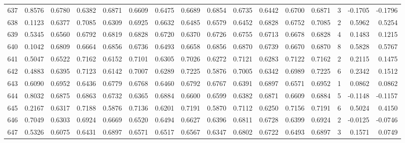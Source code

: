 \begin{tabular}{lrrrrrrrrrrrrrrr}
637 &      0.8576 &  0.6780 &  0.6382 &  0.6871 &  0.6609 &  0.6475 &  0.6689 &  0.6854 &  0.6735 &  0.6442 &   0.6700 &     0.6871 &      3 &                   -0.1705 &                    -0.1796 \\
638 &      0.1123 &  0.6377 &  0.7085 &  0.6309 &  0.6925 &  0.6632 &  0.6485 &  0.6579 &  0.6452 &  0.6828 &   0.6752 &     0.7085 &      2 &                    0.5962 &                     0.5254 \\
639 &      0.5345 &  0.6560 &  0.6792 &  0.6819 &  0.6828 &  0.6720 &  0.6370 &  0.6726 &  0.6755 &  0.6713 &   0.6678 &     0.6828 &      4 &                    0.1483 &                     0.1215 \\
640 &      0.1042 &  0.6809 &  0.6664 &  0.6856 &  0.6736 &  0.6493 &  0.6658 &  0.6856 &  0.6870 &  0.6739 &   0.6670 &     0.6870 &      8 &                    0.5828 &                     0.5767 \\
641 &      0.5047 &  0.6522 &  0.7162 &  0.6152 &  0.7101 &  0.6305 &  0.7026 &  0.6272 &  0.7121 &  0.6283 &   0.7122 &     0.7162 &      2 &                    0.2115 &                     0.1475 \\
642 &      0.4883 &  0.6395 &  0.7123 &  0.6142 &  0.7007 &  0.6289 &  0.7225 &  0.5876 &  0.7005 &  0.6342 &   0.6989 &     0.7225 &      6 &                    0.2342 &                     0.1512 \\
643 &      0.6090 &  0.6952 &  0.6436 &  0.6779 &  0.6768 &  0.6460 &  0.6792 &  0.6767 &  0.6391 &  0.6897 &   0.6571 &     0.6952 &      1 &                    0.0862 &                     0.0862 \\
644 &      0.8032 &  0.6875 &  0.6863 &  0.6732 &  0.6365 &  0.6884 &  0.6600 &  0.6599 &  0.6382 &  0.6871 &   0.6609 &     0.6884 &      5 &                   -0.1148 &                    -0.1157 \\
645 &      0.2167 &  0.6317 &  0.7188 &  0.5876 &  0.7136 &  0.6201 &  0.7191 &  0.5870 &  0.7112 &  0.6250 &   0.7156 &     0.7191 &      6 &                    0.5024 &                     0.4150 \\
646 &      0.7049 &  0.6303 &  0.6924 &  0.6669 &  0.6520 &  0.6494 &  0.6627 &  0.6396 &  0.6811 &  0.6728 &   0.6399 &     0.6924 &      2 &                   -0.0125 &                    -0.0746 \\
647 &      0.5326 &  0.6075 &  0.6431 &  0.6897 &  0.6571 &  0.6517 &  0.6567 &  0.6347 &  0.6802 &  0.6722 &   0.6493 &     0.6897 &      3 &                    0.1571 &                     0.0749 \\

\end{tabular}
